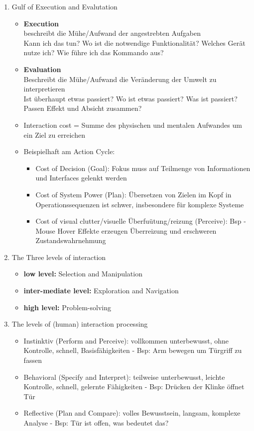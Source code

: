 \begin{enumerate}
	
	\item  Gulf of Execution and Evalutation
	\begin{itemize}
		\item \textbf{Execution}\\
		beschreibt die Mühe/Aufwand der angestrebten Aufgaben\\
		Kann ich das tun? Wo ist die notwendige Funktionalität? Welches Gerät nutze ich? Wie führe ich das Kommando aus?
		\item \textbf{Evaluation}\\
		Beschreibt die Mühe/Aufwand die Veränderung der Umwelt zu interpretieren\\
		Ist überhaupt etwas passiert? Wo ist etwas passiert? Was ist passiert? Passen Effekt und Absicht zusammen?
		\item Interaction cost = Summe des physischen und mentalen Aufwandes um ein Ziel zu erreichen
		\item Beispielhaft am Action Cycle:
		\begin{itemize}
			\item Cost of Decision (Goal): Fokus muss auf Teilmenge von Informationen und Interfaces gelenkt werden
			\item Cost of System Power (Plan): Übersetzen von Zielen im Kopf in Operationssequenzen ist schwer, insbesondere für komplexe Systeme
			\item Cost of visual clutter/visuelle Überfuütung/reizung (Perceive): Bsp - Mouse Hover Effekte erzeugen Überreizung und erschweren Zustandswahrnehmung 
		\end{itemize}
	\end{itemize}
	
	\item The Three levels of interaction
	\begin{itemize}
		\item \textbf{low level:} Selection and Manipulation
		\item \textbf{inter-mediate level:} Exploration and Navigation
		\item \textbf{high level:} Problem-solving
	\end{itemize}
	
	\item The levels of (human) interaction processing
	\begin{itemize}
		\item Instinktiv (Perform and Perceive): vollkommen unterbewusst, ohne Kontrolle, schnell, Basisfähigkeiten - Bsp: Arm bewegen um Türgriff zu fassen
		\item Behavioral (Specify and Interpret): teilweise unterbewusst, leichte Kontrolle, schnell, gelernte Fähigkeiten - Bsp: Drücken der Klinke öffnet Tür
		\item Reflective (Plan and Compare): volles Bewusstsein, langsam, komplexe Analyse - Bsp: Tür ist offen, was bedeutet das?
	\end{itemize}
	

\end{enumerate}

